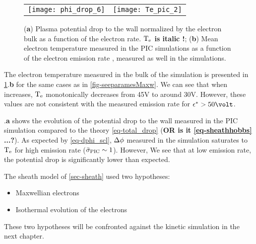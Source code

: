   \begin{figure}[hbtp]
    \centering
    \begin{tabular}{cc}
      \texttt{[image: phi\_drop\_6]}
      &
      \texttt{[image: Te\_pic\_2]}
    \end{tabular}
    \caption{({\bf a}) Plasma potential drop to the wall normalized by the electron bulk as a function of the electron rate. {\bf $\mathrm{T_e}$ is italic !}; ({\bf b}) Mean electron temperature measured in the \ac{PIC} simulations as a function of the electron emission rate \rate, measured as well in the simulations.  }
    \label{fig-Tevsproba}
  \end{figure}
  
  The electron temperature measured in the bulk of the simulation is presented in \cref{fig-Tevsproba}.{\bf b} for the same cases as in \cref{fig-seeparamesMaxw}.
  We can see that when \rate increases, $\mathrm{T_e}$ monotonically decreases from 45V to around 30V.
  However, these values are not consistent with the measured emission rate \ratepic for $\crover > 50\volt$.

  .{\bf a} shows the evolution of the potential drop to the wall measured in the \ac{PIC} simulation compared to the theory \cref{eq-total_drop} ({\bf OR is it \cref{eq-sheathhobbs} ...?}).
  As expected by \cref{eq-dphi_scl}, $\Delta \phi$ measured in the simulation saturates to $\mathrm{T_e}$ for high emission rate ($ \bar{\sigma }_{\rm PIC} \sim 1$).
  However, 
  We see that at low emission rate, the potential drop is significantly lower than expected.
  
  The sheath model of \cref{sec-sheath} used two hypotheses\string:
  \begin{itemize}
    \item Maxwellian electrons
    \item Isothermal evolution of the electrons
  \end{itemize}
  These two hypotheses will be confronted against the kinetic simulation in the next chapter.
  
   